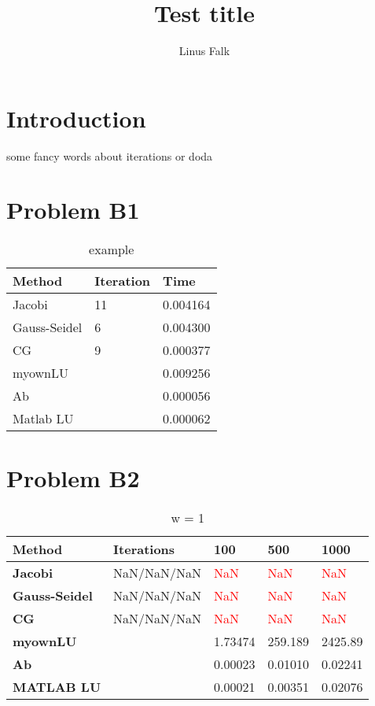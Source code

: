 \documentclass[a4paper]{article}
\title{Test title}
\author{Linus Falk}
\begin{document}
\maketitle
\section*{Introduction}
some fancy words about iterations or doda

\section*{Problem B1}

\begin{table}[ht!]
\centering
\begin{tabular}{lll}
 \textbf{Method}& \textbf{Iteration}  &\textbf{Time}\\ \hline
 Jacobi&  11& 0.004164 \\
 Gauss-Seidel&  6& 0.004300 \\ 
 CG& 9&  0.000377\\
myownLU& & 0.009256\\
Ab& & 0.000056\\
Matlab LU& & 0.000062\\\hline
\end{tabular}
\caption{example}
\label{tab:tab1}
\end{table}

\section*{Problem B2}

\begin{table}[ht!]
\centering
\begin{tabular}{lllll} 
\textbf{Method}& \textbf{Iterations}& \textbf{100}& \textbf{500}& \textbf{1000} \\ \hline
\textbf{Jacobi}& NaN/NaN/NaN& \textcolor{red}{NaN}& \textcolor{red}{NaN}& \textcolor{red}{NaN} \\ 
\textbf{Gauss-Seidel}& NaN/NaN/NaN& \textcolor{red}{NaN}& \textcolor{red}{NaN}& \textcolor{red}{NaN} \\
\textbf{CG} &NaN/NaN/NaN & \textcolor{red}{NaN}& \textcolor{red}{NaN}& \textcolor{red}{NaN} \\
\textbf{myownLU}& & 1.73474& 259.189& 2425.89\\ 
\textbf{Ab}& & 0.00023& 0.01010& 0.02241\\
\textbf{MATLAB LU}& & 0.00021& 0.00351& 0.02076 \\
 \hline

\end{tabular}
\caption{w = 1}
\label{tab:tab1}
\end{table}
\end{document}
